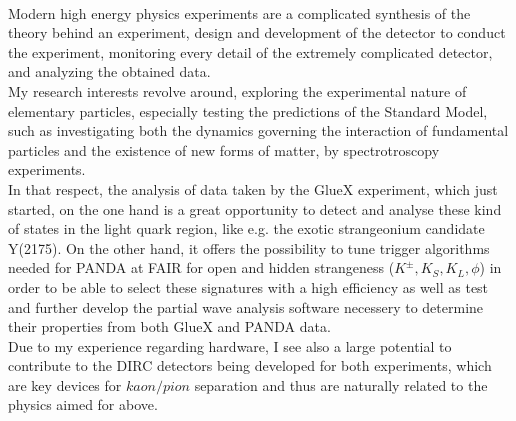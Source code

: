 \documentclass[a4paper,roman]{article}
\begin{document}
~\par Modern high energy physics experiments are a complicated synthesis of the theory behind an experiment, design and development of the detector to conduct the experiment, monitoring every detail of the extremely complicated detector, and analyzing the obtained data.\\
My research interests revolve around, exploring the experimental nature of elementary particles, especially testing the predictions of the Standard Model, such as investigating both the dynamics governing the interaction of fundamental particles and the existence of new forms of matter, by spectrotroscopy experiments.\\
In that respect, the analysis of data taken by the GlueX experiment, which just started, on the one hand is a great opportunity to detect and analyse these kind of states in the light quark region, like e.g. the exotic strangeonium candidate Y(2175). On the other hand, it offers the possibility to tune trigger algorithms needed for PANDA at FAIR for open and hidden strangeness ($K^{\pm}, K_S, K_L, \phi$) in order to be able to select these signatures with a high efficiency as well as test and further develop the partial wave analysis software necessery to determine their properties from both GlueX and PANDA data.\\
Due to my experience regarding hardware, I see also a large potential to contribute to the DIRC detectors being developed for both experiments, which are key devices for $kaon/pion$ separation and thus are naturally related to the physics aimed for above.
\end{document}
